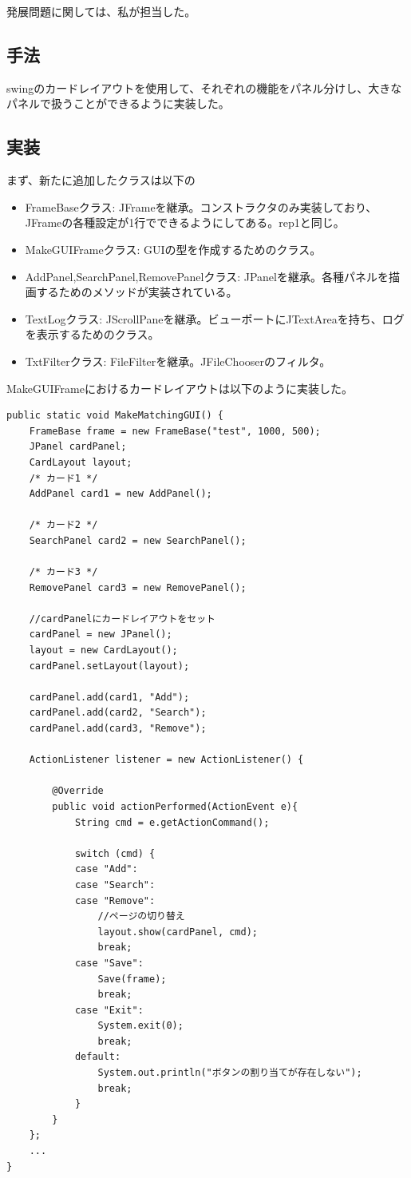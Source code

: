 \documentclass{jarticle}
\begin{document}
発展問題に関しては、私が担当した。

\subsection{手法}
swingのカードレイアウトを使用して、それぞれの機能をパネル分けし、大きなパネルで扱うことができるように実装した。

\subsection{実装}
まず、新たに追加したクラスは以下の
\begin{itemize}
\item FrameBaseクラス: JFrameを継承。コンストラクタのみ実装しており、JFrameの各種設定が1行でできるようにしてある。rep1と同じ。
\item MakeGUIFrameクラス: GUIの型を作成するためのクラス。
\item AddPanel,SearchPanel,RemovePanelクラス: JPanelを継承。各種パネルを描画するためのメソッドが実装されている。
\item TextLogクラス: JScrollPaneを継承。ビューポートにJTextAreaを持ち、ログを表示するためのクラス。
\item TxtFilterクラス: FileFilterを継承。JFileChooserのフィルタ。
\end{itemize}

MakeGUIFrameにおけるカードレイアウトは以下のように実装した。


\begin{lstlisting}[caption=GUI作成,label=src:MakeGUIFrame]
public static void MakeMatchingGUI() {
	FrameBase frame = new FrameBase("test", 1000, 500);
	JPanel cardPanel;
	CardLayout layout;
	/* カード1 */
	AddPanel card1 = new AddPanel();

	/* カード2 */
	SearchPanel card2 = new SearchPanel();

	/* カード3 */
	RemovePanel card3 = new RemovePanel();

	//cardPanelにカードレイアウトをセット
	cardPanel = new JPanel();
	layout = new CardLayout();
	cardPanel.setLayout(layout);

	cardPanel.add(card1, "Add");
	cardPanel.add(card2, "Search");
	cardPanel.add(card3, "Remove");

	ActionListener listener = new ActionListener() {

		@Override
		public void actionPerformed(ActionEvent e){
			String cmd = e.getActionCommand();

			switch (cmd) {
			case "Add":
			case "Search":
			case "Remove":
            	//ページの切り替え
				layout.show(cardPanel, cmd);
				break;
			case "Save":
				Save(frame);
				break;
			case "Exit":
				System.exit(0);
				break;
			default:
				System.out.println("ボタンの割り当てが存在しない");
				break;
			}
		}
	};
    ...
}
\end{lstlisting}
\end{document}

